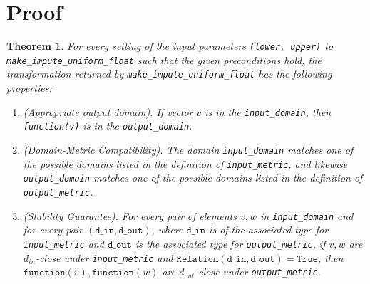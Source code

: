 \documentclass[11pt,a4paper]{article}
\newtheorem{theorem}{Theorem}[section]
\newcommand{\din}{\texttt{d\_in}}
\newcommand{\dout}{\texttt{d\_out}}
\newcommand{\Relation}{\texttt{Relation}}
\newcommand{\True}{\texttt{True}}
\newcommand{\function}{\texttt{function}}
\begin{document}
\section{Proof}
\begin{theorem}


For every setting of the input parameters \texttt{(lower, upper)} to \texttt{make\_impute\_uniform\_float} such that the given preconditions hold, the transformation returned by \texttt{make\_impute\_uniform\_float} has the following properties:
\begin{enumerate}
    \item \textup{(Appropriate output domain).} If vector $v$ is in the \texttt{input\_domain}, then \texttt{function(v)} is in the \texttt{output\_domain}.
    \item \textup{(Domain-Metric Compatibility).} The domain \texttt{input\_domain} matches one of the possible domains listed in the definition of \texttt{input\_metric}, and likewise \texttt{output\_domain} matches one of the possible domains listed in the definition of \texttt{output\_metric}.
    \item \textup{(Stability Guarantee).} For every pair of elements $v, w$ in \texttt{input\_domain} and for every pair $(\din, \dout)$, where $\din$ is of the associated type for \texttt{input\_metric} and $\dout$ is the associated type for \texttt{output\_metric}, if $v,w$ are $d_{in}$-close under \texttt{input\_metric} and $\Relation(\din, \dout) = \True$, then $\function(v), \function(w)$ are $d_{out}$-close under \texttt{output\_metric}.
\end{enumerate}
\end{theorem}
\end{document}
